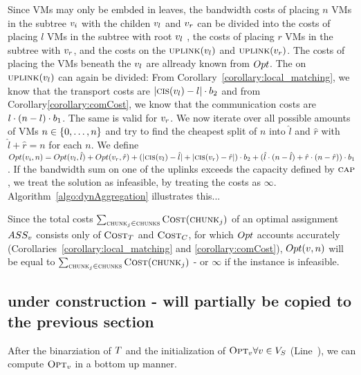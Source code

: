 Since VMs may only be embded in leaves, the bandwidth costs of placing $n$ VMs 
in the subtree $v_i$ with the childen $v_l$ and 
$v_r$ can be divided into the costs of placing $l$ VMs in the 
subtree with root $v_l$ , the costs of placing 
$r$ VMs in the subtree with $v_r$, and the costs on the 
$\textsc{uplink}(v_l)$ and $\textsc{uplink}(v_r)$. The costs of 
placing the VMs beneath the $v_l$ are allready known from $Opt$. 
The on $\textsc{uplink}(v_l)$ can again be divided: From 
Corollary~\ref{corollary:local_matching}, we know that the transport costs are 
 $|\textsc{cis}(v_l) - l| \cdot b_2$ and from 
Corollary\ref{corollary:comCost}, we know that the communication costs are 
$l\cdot (n - l) \cdot b_1$. The same is valid for $v_r$. 
We now iterate over all possible amounts of VMs $n \in \{0,\dots,n\}$ and 
try to find the cheapest split of $n$ into $\hat l$ and $\hat r$ with 
$\hat l + \hat r = n$ for each $n$. We define $Opt(v_i, n) = 
Opt(v_{l}, \hat l) + Opt(v_{r}, \hat r) + 
(|\textsc{cis}(v_{l}) - \hat 
l|+|\textsc{cis}(v_{r}) - \hat r|) \cdot b_2 + (\hat 
l\cdot (n - \hat l) + \hat r\cdot (n - \hat r)) \cdot b_1$. If the 
bandwidth sum on one of the uplinks exceeds the capacity defined by 
$\textsc{cap}$, we treat the solution as infeasible, by treating the costs as
$\infty$. Algorithm~\ref{algo:dynAggregation} illustrates this... 

Since the total costs $\sum_{\textsc{chunk}_j \in 
\textsc{chunks}}\textsc{Cost}(\textsc{chunk}_j)$ of an optimal assignment $ASS_v$ 
consists only of $\textsc{Cost}_T$ and $\textsc{Cost}_C$, for which $Opt$ accounts accurately 
(Corollaries~\ref{corollary:local_matching} and \ref{corollary:comCost}), 
$Opt(v, n)$ will be equal to $\sum_{\textsc{chunk}_j \in 
\textsc{chunks}}\textsc{Cost}(\textsc{chunk}_j)$ - or $\infty$ if the instance is infeasible.


\subsection{under construction - will partially be copied to the previous 
section}

After the binarziation of $T$ and the initialization of 
$\textsc{Opt}_{v} \forall v \in V_S$ 
(Line~), we can compute $\textsc{Opt}_{v}$ in a bottom up 
manner. 

